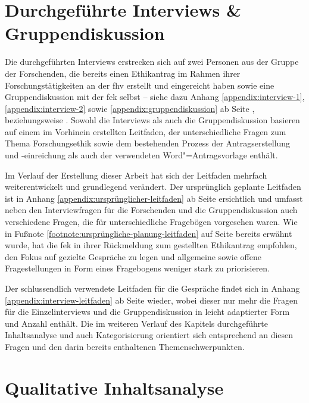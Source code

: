 \documentclass[a4paper,12pt,twoside]{scrreprt}
\begin{document}
\section{Durchgeführte Interviews \& Gruppendiskussion}
\label{sec:durchgeführte-interviews-gruppendiskussion}

Die durchgeführten Interviews erstrecken sich auf zwei Personen aus der Gruppe der Forschenden, die bereits einen Ethikantrag im Rahmen ihrer Forschungstätigkeiten an der \acl{fhv} erstellt und eingereicht haben sowie eine Gruppendiskussion mit der \ac{fek} selbst -- siehe dazu Anhang \ref{appendix:interview-1}, \ref{appendix:interview-2} sowie \ref{appendix:gruppendiskussion} ab Seite \pageref{appendix:interview-1}, \pageref{appendix:interview-2} beziehungsweise \pageref{appendix:gruppendiskussion}. Sowohl die Interviews als auch die Gruppendiskussion basieren auf einem im Vorhinein erstellten Leitfaden, der unterschiedliche Fragen zum Thema Forschungsethik sowie dem bestehenden Prozess der Antragserstellung und -einreichung als auch der verwendeten Word"=Antragsvorlage enthält.

\medskip

Im Verlauf der Erstellung dieser Arbeit hat sich der Leitfaden mehrfach weiterentwickelt und grundlegend verändert. Der ursprünglich geplante Leitfaden ist in Anhang \ref{appendix:ursprünglicher-leitfaden} ab Seite \pageref{appendix:ursprünglicher-leitfaden} ersichtlich und umfasst neben den Interviewfragen für die Forschenden und die Gruppendiskussion auch verschiedene Fragen, die für unterschiedliche Fragebögen vorgesehen waren. Wie in Fußnote \ref{footnote:ursprüngliche-planung-leitfaden} auf Seite \pageref{footnote:ursprüngliche-planung-leitfaden} bereits erwähnt wurde, hat die \ac{fek} in ihrer Rückmeldung zum gestellten Ethikantrag empfohlen, den Fokus auf gezielte Gespräche zu legen und allgemeine sowie offene Fragestellungen in Form eines Fragebogens weniger stark zu priorisieren.

Der schlussendlich verwendete Leitfaden für die Gespräche findet sich in Anhang \ref{appendix:interview-leitfaden} ab Seite \pageref{appendix:interview-leitfaden} wieder, wobei dieser nur mehr die Fragen für die Einzelinterviews und die Gruppendiskussion in leicht adaptierter Form und Anzahl enthält. Die im weiteren Verlauf des Kapitels durchgeführte Inhaltsanalyse und auch Kategorisierung orientiert sich entsprechend an diesen Fragen und den darin bereits enthaltenen Themenschwerpunkten.

\section{Qualitative Inhaltsanalyse}
\label{sec:qualitative-inhaltsanalyse}
\end{document}
